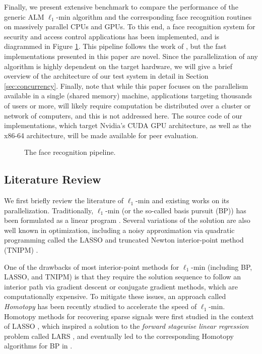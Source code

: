 \documentclass[10pt,twocolumn,letterpaper]{article}
\begin{document}
Finally, we present extensive benchmark to compare the performance of the
generic ALM $\ell_1$-min algorithm and the corresponding face recognition
routines on massively parallel CPUs and GPUs.  To this end, a face
recognition system for security and access control applications has been implemented, 
and is diagrammed in Figure \ref{fig:pipeline}. This pipeline follows the work of \cite{WagnerA2011-PAMI}, but
the fast implementations presented in this paper are novel.
Since the parallelization of any algorithm
is highly dependent on the target hardware, we will give a brief overview of
the architecture of our test system in detail in Section
\ref{sec:concurrency}.
Finally, note that 
while this paper focuses on the parallelism available in a single (shared memory) machine,
applications targeting thousands of users or more, will likely require computation be
distributed over a cluster or network of computers, and this is not addressed here.
The source code of our implementations, which target Nvidia's CUDA GPU architecture,
as well as the x86-64 architecture, will be made available for peer evaluation.
\begin{figure}
\centering
{\tiny }
\caption{The face recognition pipeline.}
\label{fig:pipeline}
\end{figure}

\subsection{Literature Review} 
We first briefly review the literature of $\ell_1$-min and existing
works on its parallelization.  Traditionally, $\ell_1$-min (or the so-called
basis pursuit (BP)) has been formulated as a linear program
\cite{ChenS2001-SIAM}. Several variations of the solution are also well known
in optimization, including a noisy approximation via quadratic programming
called the LASSO \cite{TibshiraniR1996} and truncated Newton interior-point
method (TNIPM) \cite{KimS2007}.

One of the drawbacks of most interior-point methods for $\ell_1$-min (including
BP, LASSO, and TNIPM) is that they require the solution sequence to follow an
interior path via gradient descent or conjugate gradient methods, which are computationally expensive.
To mitigate these issues, an approach called \emph{Homotopy} has been recently studied to accelerate the
speed of $\ell_1$-min. Homotopy methods for recovering sparse signals were
first studied in the context of LASSO \cite{OsborneM2000}, which inspired a
solution to the \emph{forward stagewise linear regression} problem called LARS
\cite{EfronB2004}, and eventually led to the corresponding Homotopy algorithms
for BP in \cite{MalioutovD2005,DonohoD2006}.
\end{document}
